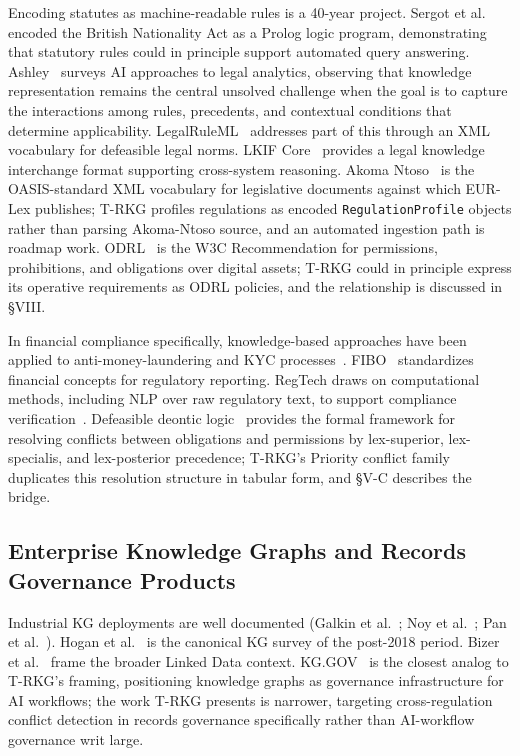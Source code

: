 \documentclass{ieeeaccess}
\begin{document}
Encoding statutes as machine-readable rules is a 40-year project. Sergot et al.~\cite{sergot1986} encoded the British Nationality Act as a Prolog logic program, demonstrating that statutory rules could in principle support automated query answering. Ashley~\cite{ashley2017} surveys AI approaches to legal analytics, observing that knowledge representation remains the central unsolved challenge when the goal is to capture the interactions among rules, precedents, and contextual conditions that determine applicability. LegalRuleML~\cite{legalruleml} addresses part of this through an XML vocabulary for defeasible legal norms. LKIF Core~\cite{lkif} provides a legal knowledge interchange format supporting cross-system reasoning. Akoma Ntoso~\cite{akomantoso} is the OASIS-standard XML vocabulary for legislative documents against which EUR-Lex publishes; T-RKG profiles regulations as encoded \texttt{RegulationProfile} objects rather than parsing Akoma-Ntoso source, and an automated ingestion path is roadmap work. ODRL~\cite{odrl} is the W3C Recommendation for permissions, prohibitions, and obligations over digital assets; T-RKG could in principle express its operative requirements as ODRL policies, and the relationship is discussed in §VIII.

In financial compliance specifically, knowledge-based approaches have been applied to anti-money-laundering and KYC processes~\cite{weber2019}. FIBO~\cite{fibo} standardizes financial concepts for regulatory reporting. RegTech draws on computational methods, including NLP over raw regulatory text, to support compliance verification~\cite{arner2017,legalbert}. Defeasible deontic logic~\cite{governatori2013} provides the formal framework for resolving conflicts between obligations and permissions by lex-superior, lex-specialis, and lex-posterior precedence; T-RKG's Priority conflict family duplicates this resolution structure in tabular form, and §V-C describes the bridge.

\subsection{Enterprise Knowledge Graphs and Records Governance Products}

Industrial KG deployments are well documented (Galkin et al.~\cite{galkin2017}; Noy et al.~\cite{noy2019}; Pan et al.~\cite{pan2024}). Hogan et al.~\cite{hogan2021} is the canonical KG survey of the post-2018 period. Bizer et al.~\cite{bizer2009,linkeddata} frame the broader Linked Data context. KG.GOV~\cite{kggov2025} is the closest analog to T-RKG's framing, positioning knowledge graphs as governance infrastructure for AI workflows; the work T-RKG presents is narrower, targeting cross-regulation conflict detection in records governance specifically rather than AI-workflow governance writ large.
\end{document}
